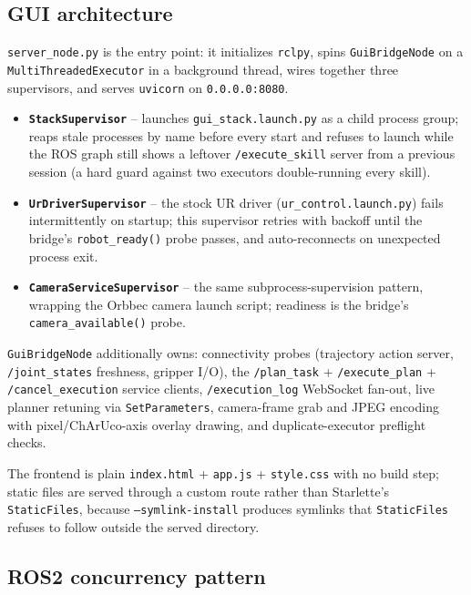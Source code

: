 \subsection{GUI architecture}

\texttt{server\_node.py} is the entry point: it initializes \texttt{rclpy},
spins \texttt{GuiBridgeNode} on a \texttt{MultiThreadedExecutor} in a
background thread, wires together three supervisors, and serves
\texttt{uvicorn} on \texttt{0.0.0.0:8080}.

\begin{itemize}[nosep]
  \item \textbf{\texttt{StackSupervisor}} -- launches
    \texttt{gui\_stack.launch.py} as a child process group; reaps stale
    processes by name before every start and refuses to launch while the ROS
    graph still shows a leftover \texttt{/execute\_skill} server from a
    previous session (a hard guard against two executors double-running
    every skill).
  \item \textbf{\texttt{UrDriverSupervisor}} -- the stock UR driver
    (\texttt{ur\_control.launch.py}) fails intermittently on startup; this
    supervisor retries with backoff until the bridge's \texttt{robot\_ready()}
    probe passes, and auto-reconnects on unexpected process exit.
  \item \textbf{\texttt{CameraServiceSupervisor}} -- the same
    subprocess-supervision pattern, wrapping the Orbbec camera launch script;
    readiness is the bridge's \texttt{camera\_available()} probe.
\end{itemize}

\texttt{GuiBridgeNode} additionally owns: connectivity probes (trajectory
action server, \texttt{/joint\_states} freshness, gripper I/O), the
\texttt{/plan\_task} + \texttt{/execute\_plan} + \texttt{/cancel\_execution}
service clients, \texttt{/execution\_log} WebSocket fan-out, live planner
retuning via \texttt{SetParameters}, camera-frame grab and JPEG encoding with
pixel/ChArUco-axis overlay drawing, and duplicate-executor preflight checks.

The frontend is plain \texttt{index.html} + \texttt{app.js} + \texttt{style.css}
with no build step; static files are served through a custom route rather
than Starlette's \texttt{StaticFiles}, because \texttt{--symlink-install}
produces symlinks that \texttt{StaticFiles} refuses to follow outside the
served directory.

\subsection{ROS2 concurrency pattern}

